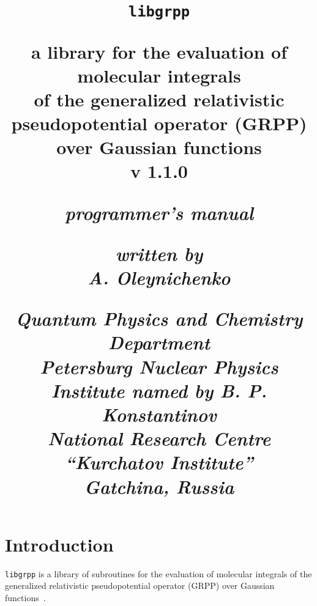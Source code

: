 \documentclass[12pt]{article}
\begin{document}

\title{
\normalsize

{\large \texttt{libgrpp}}

\bigskip

{\bf a library for the evaluation of molecular integrals \\
of the generalized relativistic pseudopotential operator (GRPP) over Gaussian functions \\
v 1.1.0}

\bigskip

\textit{programmer's manual}

\bigskip

\textit{written by \\
A. Oleynichenko}

\bigskip

\textit{Quantum Physics and Chemistry Department \\
Petersburg Nuclear Physics Institute named by B. P. Konstantinov \\
National Research Centre ``Kurchatov Institute'' \\
Gatchina, Russia}
}
\maketitle

\newpage

\tableofcontents

\newpage

\section{Introduction}

\texttt{libgrpp} is a library of subroutines for the evaluation of molecular integrals of the generalized relativistic pseudopotential operator (GRPP) over Gaussian functions~\cite{Oleynichenko:LIBGRPP:23}.
\end{document}
